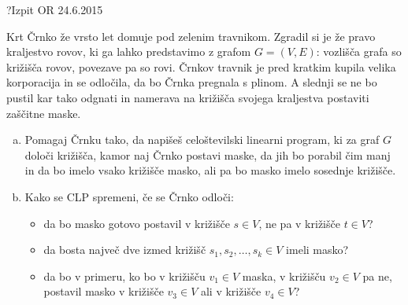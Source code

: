 \begin{naloga}{?}{Izpit OR 24.6.2015}
\begin{vprasanje}
Krt Črnko že vrsto let domuje pod zelenim travnikom.
Zgradil si je že pravo kraljestvo rovov,
ki ga lahko predstavimo z grafom $G = (V, E)$:
vozlišča grafa so križišča rovov, povezave pa so rovi.
Črnkov travnik je pred kratkim kupila velika korporacija in se odločila,
da bo Črnka pregnala s plinom.
A slednji se ne bo pustil kar tako odgnati
in namerava na križišča svojega kraljestva postaviti zaščitne maske.

\begin{enumerate}[(a)]
\item Pomagaj Črnku tako, da napišeš celoštevilski linearni program,
ki za graf $G$ določi križišča, kamor naj Črnko postavi maske,
da jih bo porabil čim manj in da bo imelo vsako križišče masko,
ali pa bo masko imelo sosednje križišče.

\item Kako se CLP spremeni, če se Črnko odloči:
    \begin{itemize}
    \item da bo masko gotovo postavil v križišče $s \in V$,
    ne pa v križišče $t \in V$?
    \item da bosta največ dve izmed križišč $s_1, s_2, \dots, s_k \in V$
    imeli masko?
    \item da bo v primeru, ko bo v križišču $v_1 \in V$ maska,
    v križišču $v_2 \in V$ pa ne,
    postavil masko v križišče $v_3 \in V$ ali v križišče $v_4 \in V$?
    \end{itemize}
\end{enumerate}
\end{vprasanje}
\begin{odgovor}
\end{odgovor}
\end{naloga}


